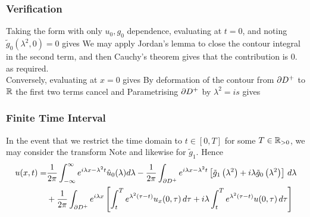 \documentclass{article}
\begin{document}
\subsubsection{Verification}
Taking the form with only $u_0,g_0$ dependence, evaluating at $t=0$, and noting $\tilde{g}_0(\lambda^2,0)=0$ gives 
We may apply Jordan's lemma to close the contour integral in the second term, and then Cauchy's theorem gives that the contribution is 0. 
as required. \\
Conversely, evaluating at $x=0$ gives 
By deformation of the contour from $\partial D^+$ to $\mathbb{R}$ the first two terms cancel and 
Parametrising $\partial D^+$ by $\lambda^2 = is$ gives 
\subsubsection{Finite Time Interval}
In the event that we restrict the time domain to $t \in [0,T]$ for some $T \in \mathbb{R}_{>0}$, we may consider the transform 
Note 
and likewise for $\tilde{g}_1$. Hence 
\begin{align}
 u ( x , t ) =& \frac { 1 } { 2 \pi } \int _ { - \infty } ^ { \infty } e ^ { i \lambda x - \lambda ^ { 2 } t } \hat { u } _ { 0 } ( \lambda ) d \lambda - \frac { 1 } { 2 \pi } \int _ { \partial D ^ { + } } e ^ { i \lambda x - \lambda ^ { 2 } t } \left[ \tilde { g } _ { 1 } \left( \lambda ^ { 2 }  \right) + i \lambda \tilde { g } _ { 0 } \left( \lambda ^ { 2 }  \right) \right] \, d \lambda   \\
 & +\frac{1}{2\pi} \int_{\partial D^+} e^{i\lambda x} \left[ \int_t^T e^{\lambda^2(\tau-t)} u_x(0,\tau) \, d\tau + i\lambda \int_t^T e^{\lambda^2(\tau-t)} u(0,\tau) \, d\tau \right]
\end{align}
\end{document}
